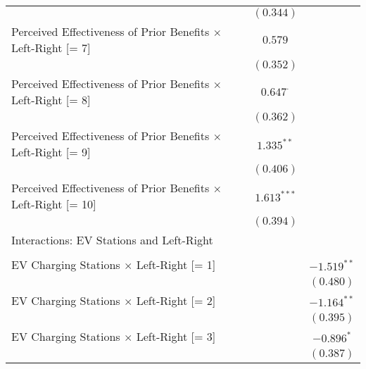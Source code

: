 \begin{center}
\begin{tiny}
\begin{longtable}{l@{} c@{} c@{}}
                                                                           & $(0.344)$        &                  \\
\quad Perceived Effectiveness of Prior Benefits $\times$ Left-Right [= 7]  & $0.579$          &                  \\
                                                                           & $(0.352)$        &                  \\
\quad Perceived Effectiveness of Prior Benefits $\times$ Left-Right [= 8]  & $0.647^{\cdot}$  &                  \\
                                                                           & $(0.362)$        &                  \\
\quad Perceived Effectiveness of Prior Benefits $\times$ Left-Right [= 9]  & $1.335^{**}$     &                  \\
                                                                           & $(0.406)$        &                  \\
\quad Perceived Effectiveness of Prior Benefits $\times$ Left-Right [= 10] & $1.613^{***}$    &                  \\
                                                                           & $(0.394)$        &                  \\
Interactions: EV Stations and Left-Right                                   &                  &                  \\
                                                                           &                  &                  \\
\quad EV Charging Stations $\times$ Left-Right [= 1]                       &                  & $-1.519^{**}$    \\
                                                                           &                  & $(0.480)$        \\
\quad EV Charging Stations $\times$ Left-Right [= 2]                       &                  & $-1.164^{**}$    \\
                                                                           &                  & $(0.395)$        \\
\quad EV Charging Stations $\times$ Left-Right [= 3]                       &                  & $-0.896^{*}$     \\
                                                                           &                  & $(0.387)$        \\

\end{longtable}
\end{tiny}
\end{center}
